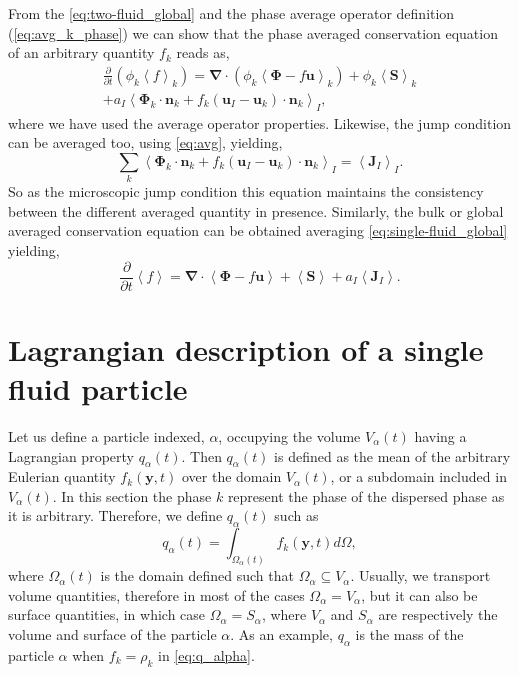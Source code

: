 \documentclass[twocolumn]{My_article}
\newcommand{\avg}[1]{\left<#1\right>}
\newcommand{\kavg}[1]{\left<#1\right>_k}
\newcommand{\Iavg}[1]{\left<#1\right>_I}
\newcommand{\nablab}{\bm{\nabla}}
\newcommand{\pddt}{\frac{\partial}{\partial t}}
\begin{document}
From the \ref{eq:two-fluid_global} and the phase average operator definition (\ref{eq:avg_k_phase}) we can show that the phase averaged conservation equation of an arbitrary quantity $f_k$ reads as,
\begin{multline}
    \pddt (\phi_k\kavg{f})
    = \nablab \cdot \left(
        \phi_k \kavg{\bm{\Phi} - f \textbf{u}}
    \right)
    + \phi_k \kavg{\textbf{S}}\\
    + a_I \Iavg{
        \bm{\Phi}_k \cdot \textbf{n}_k
        + f_k
        \left(
            \textbf{u}_I
            - \textbf{u}_k
        \right) \cdot \textbf{n}_k
    },
    \label{eq:avg_k_global}
\end{multline}
where we have used the average operator properties.
Likewise, the jump condition can be averaged too, using \ref{eq:avg}, yielding,
\begin{equation}
    \sum_k
    \Iavg{
        \bm{\Phi}_k
        \cdot \textbf{n}_k
        + f_k
        \left(
            \textbf{u}_I
            - \textbf{u}_k
        \right)
        \cdot \textbf{n}_k
    }
    = \Iavg{\textbf{J}_I}.
    \label{eq:avg_general_jump}
\end{equation}
So as the microscopic jump condition this equation maintains the consistency between the different averaged quantity in presence.
Similarly, the bulk or global averaged conservation equation can be obtained averaging \ref{eq:single-fluid_global} yielding,
\begin{equation*}
    \pddt \avg{f}
    = \nablab \cdot \avg{\bm{\Phi} - f \textbf{u}}
    + \avg{\textbf{S}}
    + a_I\avg{\textbf{J}_I}.
    \label{eq:avg_global}
\end{equation*}

\section{Lagrangian description of a single fluid particle}


Let us define a particle indexed, $\alpha$, occupying the volume $V_\alpha(t)$ having a Lagrangian property $q_\alpha(t)$.
Then $q_\alpha(t)$ is defined as the mean of the arbitrary Eulerian quantity $f_k(\textbf{y},t)$ over the domain $V_\alpha(t)$, or a subdomain included in $V_\alpha(t)$.
In this section the phase $k$ represent the phase of the dispersed phase as it is arbitrary.
Therefore, we define $q_\alpha(t)$ such as
\begin{equation}
    q_\alpha(t)
    = \int_{\Omega_\alpha(t)} f_k(\textbf{y},t) d\Omega,
    \label{eq:q_alpha}
\end{equation}
where $\Omega_\alpha(t)$ is the domain defined such that $\Omega_\alpha \subseteq  V_\alpha$.
Usually, we transport volume quantities, therefore in most of the cases $\Omega_\alpha = V_\alpha$, but it can also be surface quantities, in which case $\Omega_\alpha = S_\alpha$, where $V_\alpha$ and $S_\alpha$ are respectively the volume and surface of the particle $\alpha$.
As an example, $q_\alpha$ is the mass of the particle $\alpha$ when $f_k = \rho_k$ in \ref{eq:q_alpha}.
\end{document}
